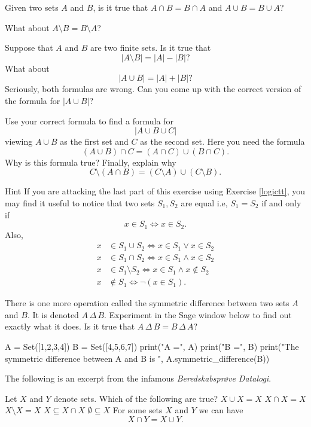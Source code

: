\documentclass{article}
\begin{document}
\beginshex
Given two sets $A$ and $B$, is it true that
$A \cap B = B \cap A$ and $A\cup B = B\cup A$?

What about $A\setminus B = B\setminus A$?

Suppose that $A$ and $B$ are two finite sets. Is it true that
$$
|A\setminus B| = |A| - |B|?
$$
What about
$$
|A\cup B| = |A| + |B|?
$$
Seriously, both formulas are wrong. Can you come up with the correct
version of the formula for $|A \cup B|$?

Use your correct formula to find a formula for
$$
|A\cup B \cup C|
$$
viewing $A\cup B$ as the first set and $C$ as the second set. Here you need
the formula
$$
(A\cup B)\cap C = (A\cap C) \cup (B\cap C).
$$
Why is this formula true? Finally, explain why
$$
C \setminus (A\cap B) = (C\setminus A) \cup (C\setminus B).
$$
\begin{hideinbutton}{Hint}
If you are attacking the last part of this exercise using Exercise \ref{logictt}, you
may find it useful to notice that two sets $S_1, S_2$ are equal i.e, $S_1 = S_2$
if and only if
$$
x\in S_1 \iff x\in S_2.
$$
Also,
\begin{align*}
x &\in S_1 \cup S_2 \iff x\in S_1 \lor x\in S_2\\
x &\in S_1 \cap S_2 \iff x\in S_1 \land x\in S_2\\
x &\in S_1 \setminus S_2 \iff x\in S_1 \land x\not\in S_2\\
x &\not\in S_1 \iff \neg (x\in S_1).
\end{align*}
\end{hideinbutton}
\endshex

\beginshex
There is one more operation called the symmetric difference between two sets $A$ and $B$. It is
denoted $A\, \Delta\, B$. Experiment in the Sage window below to find out exactly what it does.
Is it true that $A\, \Delta\, B = B\, \Delta\, A$?

\begin{sage}
A = Set([1,2,3,4])
B = Set([4,5,6,7])
print("A =", A)
print("B =", B)
print("The symmetric difference between A and B is ", A.symmetric_difference(B))
\end{sage}
\endshex

The following is an excerpt from the infamous \emph{Beredskabsprøve Datalogi}.

\begin{quizexercise}[showhide]
\begin{quiz}
\question
Let $X$ and $Y$ denote sets. Which of the following are true?
$X \cup X = X$
$X\cap X = X$
$X\setminus X = X$
$X\subseteq X\cap X$
$\emptyset \subseteq X$
For some sets $X$ and $Y$ we can have
$$
X\cap Y = X\cup Y.
$$
\end{quiz}
\end{quizexercise}
\end{document}
